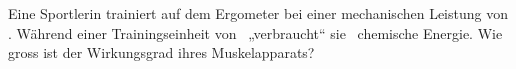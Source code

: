 Eine Sportlerin trainiert auf dem Ergometer bei einer mechanischen Leistung von \PerO. Während einer Trainingseinheit von \terO\ „verbraucht“ sie \EchO\ chemische Energie. Wie gross ist der Wirkungsgrad ihres Muskelapparats?
